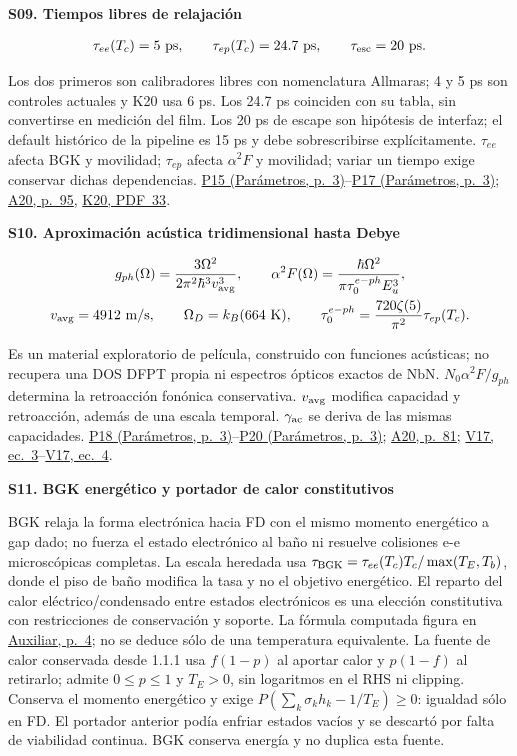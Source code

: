 \documentclass[11pt,a4paper]{article}
\newcommand{\block}[1]{\par\vspace{6pt}{\large\bfseries\color{ink}#1}\par\vspace{3pt}}
\newcommand{\K}[1]{\href{https://eprints.lancs.ac.uk/id/eprint/140252/3/Binder1.pdf\#page=#1}{K20, PDF~#1}}
\newcommand{\A}[1]{\href{https://thesis.caltech.edu/13748/}{A20, p.~#1}}
\newcommand{\V}[1]{\href{https://arxiv.org/abs/1611.06060}{V17, ec.~#1}}
\newcommand{\pref}[2]{\href{Parametros.pdf\#nameddest=#1}{#1 (Parámetros, p.~#2)}}
\newcommand{\assumption}[2]{\par\vspace{6pt}\hypertarget{#1}{\textbf{\color{ink}#1. #2}}\par}
\newcommand{\smallnote}[1]{{\small #1\par}}
\begin{document}
\block{Cinética y material fonónico efectivo}
\assumption{S09}{Tiempos libres de relajación}
\begin{gather*}
 \tau_{ee}(T_c)=5\ {\rm ps},\qquad
 \tau_{ep}(T_c)=24.7\ {\rm ps},\qquad
 \tau_{\rm esc}=20\ {\rm ps}.
\end{gather*}
\smallnote{Los dos primeros son calibradores libres con nomenclatura Allmaras; 4 y 5 ps son controles actuales y K20 usa 6 ps. Los 24.7 ps coinciden con su tabla, sin convertirse en medición del film. Los 20 ps de escape son hipótesis de interfaz; el default histórico de la pipeline es 15 ps y debe sobrescribirse explícitamente. $\tau_{ee}$ afecta BGK y movilidad; $\tau_{ep}$ afecta $\alpha^2F$ y movilidad; variar un tiempo exige conservar dichas dependencias. \pref{P15}{3}--\pref{P17}{3}; \A{95}, \K{33}.}
\assumption{S10}{Aproximación acústica tridimensional hasta Debye}
\begin{gather*}
 g_{ph}(\Omega)=\frac{3\Omega^2}{2\pi^2\hbar^3v_{\rm avg}^3},\qquad
 \alpha^2F(\Omega)=\frac{\hbar\Omega^2}{\pi\tau_0^{e-ph}E_u^3},\\
 v_{\rm avg}=4912\ {\rm m/s},\qquad
 \Omega_D=k_B(664\ {\rm K}),\qquad
 \tau_0^{e-ph}=\frac{720\zeta(5)}{\pi^2}\tau_{ep}(T_c).
\end{gather*}
\smallnote{Es un material exploratorio de película, construido con funciones acústicas; no recupera una DOS DFPT propia ni espectros ópticos exactos de NbN. $N_0\alpha^2F/g_{ph}$ determina la retroacción fonónica conservativa. $v_{\rm avg}$ modifica capacidad y retroacción, además de una escala temporal. $\gamma_{\rm ac}$ se deriva de las mismas capacidades. \pref{P18}{3}--\pref{P20}{3}; \A{81}; \V{3}--\V{4}.}
\assumption{S11}{BGK energético y portador de calor constitutivos}
\smallnote{BGK relaja la forma electrónica hacia FD con el mismo momento energético a gap dado; no fuerza el estado electrónico al baño ni resuelve colisiones e-e microscópicas completas. La escala heredada usa $\tau_{\rm BGK}=\tau_{ee}(T_c)T_c/\max(T_E,T_b)$, donde el piso de baño modifica la tasa y no el objetivo energético. El reparto del calor eléctrico/condensado entre estados electrónicos es una elección constitutiva con restricciones de conservación y soporte. La fórmula computada figura en \href{Auxiliar.pdf\#nameddest=carrier-exacto}{Auxiliar, p.~4}; no se deduce sólo de una temperatura equivalente. La fuente de calor conservada desde 1.1.1 usa $f(1-p)$ al aportar calor y $p(1-f)$ al retirarlo; admite $0\le p\le1$ y $T_E>0$, sin logaritmos en el RHS ni clipping. Conserva el momento energético y exige $P(\sum_k\sigma_kh_k-1/T_E)\ge0$: igualdad sólo en FD. El portador anterior podía enfriar estados vacíos y se descartó por falta de viabilidad continua. BGK conserva energía y no duplica esta fuente.}
\end{document}
